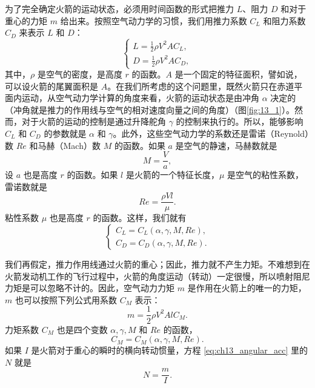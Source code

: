 为了完全确定火箭的运动状态，必须用时间函数的形式把推力 $L$、阻力 $D$ 和对于重心的力矩 $m$ 给出来。按照空气动力学的习惯，我们用推力系数 $C_L$ 和阻力系数 $C_D$ 来表示 $L$ 和 $D$：
\begin{equation}\label{eq:ch13_lift_drag}
\begin{cases}
L = \frac{1}{2}\rho V^2 A C_L,\\
D = \frac{1}{2}\rho V^2 A C_D,
\end{cases}
\end{equation}
其中，$\rho$ 是空气的密度，是高度 $r$ 的函数。$A$ 是一个固定的特征面积，譬如说，可以设火箭的尾翼面积是 $A$。在我们所考虑的这个问题里，既然火箭只在赤道平面内运动，从空气动力学计算的角度来看，火箭的运动状态是由冲角 $\alpha$ 决定的（冲角就是推力的作用线与空气的相对速度向量之间的角度）（图\ref{fig:13_1}）。然而，对于火箭的运动的控制是通过升降舵角 $\gamma$ 的控制来执行的。所以，能够影响 $C_L$ 和 $C_D$ 的参数就是 $\alpha$ 和 $\gamma$。此外，这些空气动力学的系数还是雷诺（Reynold）数 $Re$ 和马赫（Mach）数 $M$ 的函数。如果 $a$ 是空气的静速，马赫数就是
\begin{equation}\label{eq:ch13_mach}
M = \frac{V}{a},
\end{equation}
设 $a$ 也是高度 $r$ 的函数。如果 $l$ 是火箭的一个特征长度，$\mu$ 是空气的粘性系数，雷诺数就是
\begin{equation}\label{eq:ch13_reynolds}
Re = \frac{\rho V l}{\mu}.
\end{equation}
粘性系数 $\mu$ 也是高度 $r$ 的函数。这样，我们就有
\begin{equation}\label{eq:ch13_coefficients}
\begin{cases}
C_L = C_L(\alpha, \gamma, M, Re), \\
C_D = C_D(\alpha, \gamma, M, Re).
\end{cases}
\end{equation}

我们再假定，推力作用线通过火箭的重心；因此，推力就不产生力矩。不难想到在火箭发动机工作的飞行过程中，火箭的角度运动（转动）一定很慢，所以喷射阻尼力矩是可以忽略不计的。因此，空气动力力矩 $m$ 是作用在火箭上的唯一的力矩，$m$ 也可以按照下列公式用系数 $C_M$ 表示：
\begin{equation}\label{eq:ch13_moment}
m = \frac{1}{2} \rho V^2 A l C_M.
\end{equation}
力矩系数 $C_M$ 也是四个变数 $\alpha, \gamma, M$ 和 $Re$ 的函数，
\begin{equation}\label{eq:ch13_moment_coef}
C_M = C_M(\alpha, \gamma, M, Re).
\end{equation}
如果 $I$ 是火箭对于重心的瞬时的横向转动惯量，方程 \eqref{eq:ch13_angular_acc} 里的 $N$ 就是
\begin{equation}\label{eq:ch13_N}
N = \frac{m}{I}.
\end{equation}

